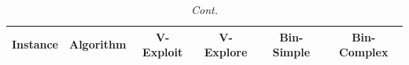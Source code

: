\documentclass[mathematics,article,accept,moreauthors]{Definitions/mdpi}
\begin{document}
\begin{table}[H]\ContinuedFloat
\caption{\textit{Cont.}}
\label{tab:computational_cost_all_instances}

  \footnotesize
  \setlength{\tabcolsep}{4pt}

  \begin{tabularx}{\textwidth}{XLCCCC}

\toprule
\textbf{Instance} & \textbf{Algorithm} & \textbf{V-Exploit} & \textbf{V-Explore} & \textbf{Bin-Simple} & \textbf{Bin-Complex} \\
\midrule






\end{tabularx}
\end{table}
\end{document}
